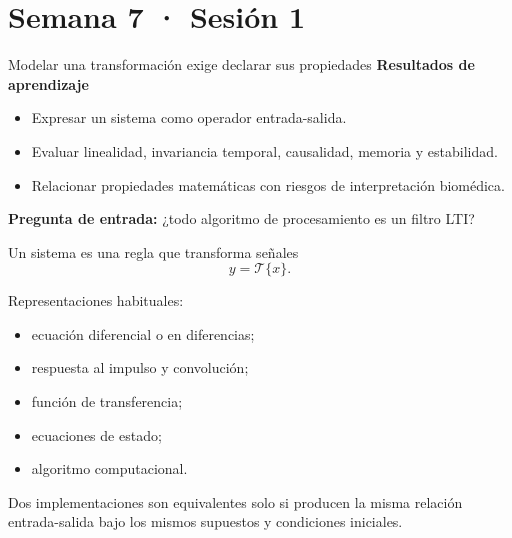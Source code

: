 \documentclass[
  ignorenonframetext,
  aspectratio=169,
  spanish,
  professionalfonts]{beamer}
\providecommand{\tightlist}{%
  \setlength{\itemsep}{0pt}\setlength{\parskip}{0pt}}
\begin{document}
\section{Semana 7 · Sesión 1}\label{semana-7-sesiuxf3n-1}

\begin{frame}{Modelar una transformación exige declarar sus propiedades}
\protect{}\label{modelar-una-transformaciuxf3n-exige-declarar-sus-propiedades}
\textbf{Resultados de aprendizaje}

\begin{itemize}
\tightlist
\item
  Expresar un sistema como operador entrada-salida.
\item
  Evaluar linealidad, invariancia temporal, causalidad, memoria y
  estabilidad.
\item
  Relacionar propiedades matemáticas con riesgos de interpretación
  biomédica.
\end{itemize}

\textbf{Pregunta de entrada:} ¿todo algoritmo de procesamiento es un
filtro LTI?
\end{frame}

\begin{frame}{Un sistema es una regla que transforma señales}
\protect{}\label{un-sistema-es-una-regla-que-transforma-seuxf1ales}
\[
y=\mathcal{T}\{x\}.
\]

Representaciones habituales:

\begin{itemize}
\tightlist
\item
  ecuación diferencial o en diferencias;
\item
  respuesta al impulso y convolución;
\item
  función de transferencia;
\item
  ecuaciones de estado;
\item
  algoritmo computacional.
\end{itemize}

\begin{tcolorbox}[enhanced jigsaw, arc=.35mm, bottomrule=.15mm, bottomtitle=1mm, breakable, colback=white, colbacktitle=quarto-callout-important-color!10!white, colframe=quarto-callout-important-color-frame, coltitle=black, left=2mm, leftrule=.75mm, opacityback=0, opacitybacktitle=0.6, rightrule=.15mm, title={Concepto principal}, titlerule=0mm, toprule=.15mm, toptitle=1mm]

Dos implementaciones son equivalentes solo si producen la misma relación
entrada-salida bajo los mismos supuestos y condiciones iniciales.

\end{tcolorbox}
\end{frame}
\end{document}
